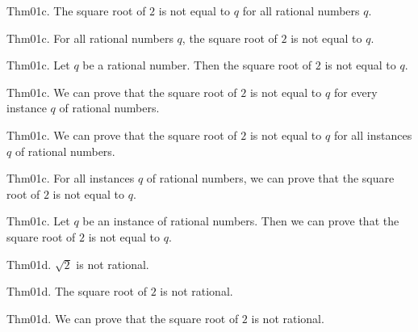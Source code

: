 \documentclass{article}
\begin{document}
Thm01c. The square root of $2$ is not equal to $q$ for all rational numbers $q$.

Thm01c. For all rational numbers $q$, the square root of $2$ is not equal to $q$.

Thm01c. Let $q$ be a rational number. Then the square root of $2$ is not equal to $q$.

Thm01c. We can prove that the square root of $2$ is not equal to $q$ for every instance $q$ of rational numbers.

Thm01c. We can prove that the square root of $2$ is not equal to $q$ for all instances $q$ of rational numbers.

Thm01c. For all instances $q$ of rational numbers, we can prove that the square root of $2$ is not equal to $q$.

Thm01c. Let $q$ be an instance of rational numbers. Then we can prove that the square root of $2$ is not equal to $q$.

Thm01d. $\sqrt{ 2}$ is not rational.

Thm01d. The square root of $2$ is not rational.

Thm01d. We can prove that the square root of $2$ is not rational.
\end{document}

